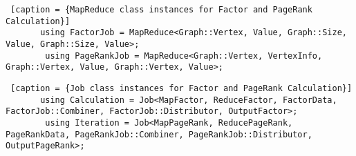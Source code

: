 \documentclass{article}
\begin{document}
    \begin{lstlisting} [caption = {MapReduce class instances for Factor and PageRank Calculation}]
       using FactorJob = MapReduce<Graph::Vertex, Value, Graph::Size, Value, Graph::Size, Value>;
        using PageRankJob = MapReduce<Graph::Vertex, VertexInfo, Graph::Vertex, Value, Graph::Vertex, Value>;
    \end{lstlisting}
    
     \begin{lstlisting} [caption = {Job class instances for Factor and PageRank Calculation}]
       using Calculation = Job<MapFactor, ReduceFactor, FactorData, FactorJob::Combiner, FactorJob::Distributor, OutputFactor>;
        using Iteration = Job<MapPageRank, ReducePageRank, PageRankData, PageRankJob::Combiner, PageRankJob::Distributor, OutputPageRank>;
    \end{lstlisting}
    
    \clearpage
    
    
    
    
\end{document}
